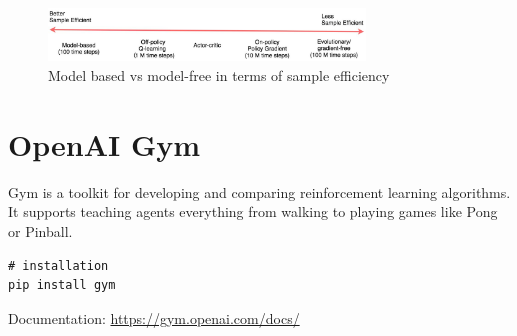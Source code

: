 \documentclass{article}
\begin{document}
\begin{figure}[H]
    \centering
    \includegraphics[width=0.75\textwidth]{img/modelbased-vs-modelfree.png}
    \caption{Model based vs model-free in terms of sample efficiency}
\end{figure}

\section{OpenAI Gym}

Gym is a toolkit for developing and comparing reinforcement learning algorithms. 
It supports teaching agents everything from walking to playing games like Pong or Pinball.

\begin{verbatim}
# installation
pip install gym
\end{verbatim}

Documentation: \url{https://gym.openai.com/docs/}
\end{document}
